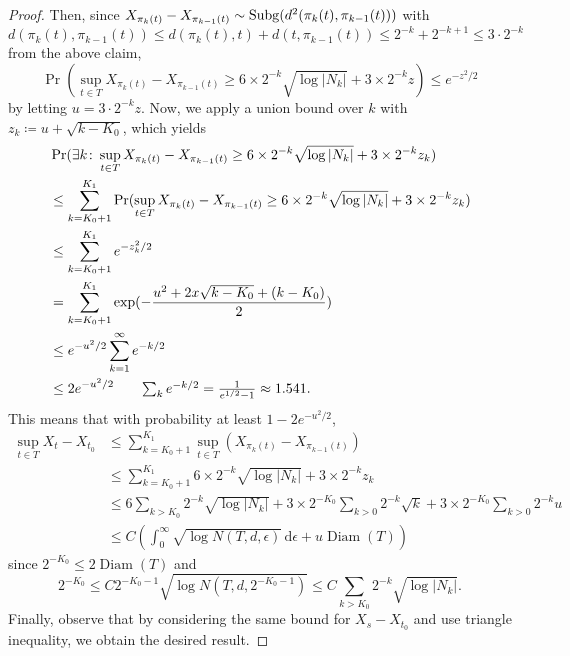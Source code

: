 \begin{proof}
	Then, since \(X_{\pi _k(t)} - X_{\pi _{k-1}(t)} \sim \operatorname{Subg}(d^2(\pi _k(t), \pi _{k-1}(t)))\) with
	\[
		d(\pi _k(t), \pi _{k-1}(t))
		\leq d(\pi _k(t), t) + d(t, \pi _{k-1}(t))
		\leq 2^{-k} + 2^{-k+1}
		\leq 3\cdot 2^{-k}
	\]
	from the above claim,
	\[
		\Pr(\sup _{t\in T} X_{\pi _k(t)} - X_{\pi _{k-1}(t)} \geq 6 \times 2^{-k} \sqrt{\log \vert N_k \vert } + 3 \times 2^{-k} z ) \leq e^{-z^2 / 2}
	\]
	by letting \(u = 3\cdot 2^{-k} z\). Now, we apply a union bound over \(k\) with \(z_k \coloneqq u + \sqrt{k - K_{0} } \), which yields
	\begin{align*}
		 & \Pr(\exists k \colon \sup _{t\in T} X_{\pi _k(t)} - X_{\pi _{k-1}(t)} \geq 6 \times 2^{-k} \sqrt{\log \vert N_k \vert } + 3 \times 2^{-k} z_k )            \\
		 & \leq \sum_{k=K_0 + 1}^{K_1} \Pr(\sup _{t\in T} X_{\pi _k(t)} - X_{\pi _{k-1}(t)} \geq 6 \times 2^{-k} \sqrt{\log \vert N_k \vert } + 3 \times 2^{-k} z_k ) \\
		 & \leq \sum_{k=K_0 + 1}^{K_1} e^{- z_k^2 / 2}                                                                                                                \\
		 & = \sum_{k=K_0 + 1}^{K_1} \exp (- \frac{u^2 + 2x \sqrt{k - K_0} + (k - K_0)}{2})                                                                            \\
		 & \leq e^{-u^2 / 2} \sum_{k = 1}^{\infty } e^{- k / 2}                                                                                                       \\
		 & \leq 2 e^{-u^2 / 2} \tag*{\(\sum_{k} e^{- k / 2} = \frac{1}{e^{1 / 2} - 1} \approx 1.541\)}.
	\end{align*}
	This means that with probability at least \(1 - 2 e^{-u^2 / 2}\),
	\[
		\begin{split}
			\sup _{t\in T} X_t - X_{t_0}
			&\leq \sum_{k=K_0 + 1}^{K_1} \sup _{t\in T} \left( X_{\pi _k(t)} - X_{\pi _{k-1}(t)} \right)\\
			&\leq \sum_{k=K_0 + 1}^{K_1} 6 \times 2^{-k} \sqrt{\log \vert N_k \vert } + 3 \times 2^{-k} z_k\\
			&\leq 6 \sum_{k > K_0} 2^{-k} \sqrt{\log \vert N_k \vert } + 3 \times 2^{-K_0} \sum_{k > 0} 2^{-k} \sqrt{k} + 3 \times 2^{-K_0} \sum_{k > 0} 2^{-k} u \\
			&\leq C \left( \int_{0}^{\infty} \sqrt{\log N(T, d, \epsilon)}  \,\mathrm{d}\epsilon + u \mathop{\mathrm{Diam}}(T) \right)
		\end{split}
	\]
	since \(2^{-K_0} \leq 2 \mathop{\mathrm{Diam}}(T) \) and
	\[
		2^{-K_0} \leq C 2^{- K_0 - 1} \sqrt{\log N(T, d, 2^{-K_0 - 1})} \leq C \sum_{k > K_0} 2^{-k} \sqrt{\log \vert N_k \vert } .
	\]
	Finally, observe that by considering the same bound for \(X_s - X_{t_0}\) and use triangle inequality, we obtain the desired result.
\end{proof}

